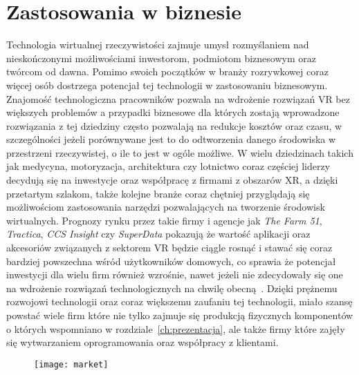 \chapter{Zastosowania w biznesie}
\label{ch:biznes}
 Technologia wirtualnej rzeczywistości zajmuje umysł rozmyślaniem nad nieskończonymi możliwościami inwestorom, podmiotom biznesowym oraz twórcom od  dawna. Pomimo swoich początków w branży rozrywkowej coraz więcej osób dostrzega potencjał tej technologii w zastosowaniu biznesowym. Znajomość technologiczna pracowników pozwala na wdrożenie rozwiązań VR bez większych problemów a przypadki biznesowe dla których zostają wprowadzone rozwiązania z tej dziedziny często pozwalają na redukcje kosztów oraz czasu, w szczególności jeżeli porównywane jest to do odtworzenia danego środowiska w przestrzeni rzeczywistej, o ile to jest w ogóle możliwe. W wielu dziedzinach takich jak medycyna, motoryzacja, architektura czy lotnictwo coraz częściej liderzy decydują się na inwestycje oraz współpracę z firmami z obszarów XR, a dzięki przetartym szlakom, także kolejne branże coraz chętniej przyglądają się możliwościom zastosowania narzędzi pozwalających na tworzenie środowisk wirtualnych. Prognozy rynku przez takie firmy i agencje jak \textit{The Farm 51}, \textit{Tractica}, \textit{CCS Insight} czy \textit{SuperData} pokazują że wartość aplikacji oraz akcesoriów związanych z sektorem VR będzie ciągle rosnąć i stawać się coraz bardziej powszechna wśród użytkowników domowych, co sprawia że potencjał inwestycji dla wielu firm również wzrośnie, nawet jeżeli nie zdecydowały się one na wdrożenie rozwiązań technologicznych na chwilę obecną~\cite{raportVR}. Dzięki prężnemu rozwojowi technologii oraz coraz większemu zaufaniu tej technologii, miało szansę powstać wiele firm które nie tylko zajmuje się produkcją fizycznych komponentów o których wspomniano w rozdziale~\ref{ch:prezentacja}, ale także firmy które zajęły się wytwarzaniem oprogramowania oraz współpracy z klientami.
 \begin{figure}[h]
\centering
\texttt{[image: market]}
\label{fig:market}
\end{figure}
